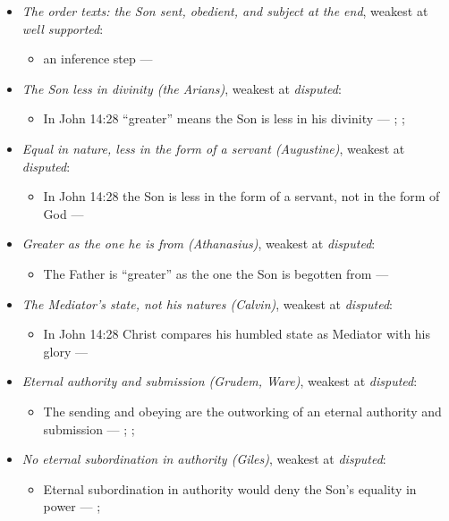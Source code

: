 \documentclass[11pt,paper=\testimonypaper,DIV=13,parskip=false]{scrartcl}
\begin{document}
\begin{itemize}
\item \emph{The order texts: the Son sent, obedient, and subject at the end}, weakest at \emph{well supported}:
\begin{itemize}
\item an inference step --- \cite[3, The Triune God]{kibbey-living-systematic-theology-2026}
\end{itemize}
\item \emph{The Son less in divinity (the Arians)}, weakest at \emph{disputed}:
\begin{itemize}
\item In John 14:28 “greater” means the Son is less in his divinity --- \cite[De Synodis 28]{schaff-nicene-post-nicene-fathers-2-4-1892}; \cite[On the Trinity I.7.14]{schaff-nicene-post-nicene-fathers-1-3-1887}; \cite[102]{calvin-commentary-john-2-1847}
\end{itemize}
\item \emph{Equal in nature, less in the form of a servant (Augustine)}, weakest at \emph{disputed}:
\begin{itemize}
\item In John 14:28 the Son is less in the form of a servant, not in the form of God --- \cite[On the Trinity I.7.14]{schaff-nicene-post-nicene-fathers-1-3-1887}
\end{itemize}
\item \emph{Greater as the one he is from (Athanasius)}, weakest at \emph{disputed}:
\begin{itemize}
\item The Father is “greater” as the one the Son is begotten from --- \cite[Against the Arians I.13.58]{schaff-nicene-post-nicene-fathers-2-4-1892}
\end{itemize}
\item \emph{The Mediator’s state, not his natures (Calvin)}, weakest at \emph{disputed}:
\begin{itemize}
\item In John 14:28 Christ compares his humbled state as Mediator with his glory --- \cite[102--103]{calvin-commentary-john-2-1847}
\end{itemize}
\item \emph{Eternal authority and submission (Grudem, Ware)}, weakest at \emph{disputed}:
\begin{itemize}
\item The sending and obeying are the outworking of an eternal authority and submission --- \cite[40]{grudem-doctrinal-deviations-2015}; \cite{grudem-ets-trinity-2016}; \cite{ware-father-son-holy-spirit-2005}
\end{itemize}
\item \emph{No eternal subordination in authority (Giles)}, weakest at \emph{disputed}:
\begin{itemize}
\item Eternal subordination in authority would deny the Son’s equality in power --- \cite[323]{giles-ets-trinity-2008}; \cite{giles-jesus-and-the-father-2006}
\end{itemize}
\end{itemize}
\end{document}
